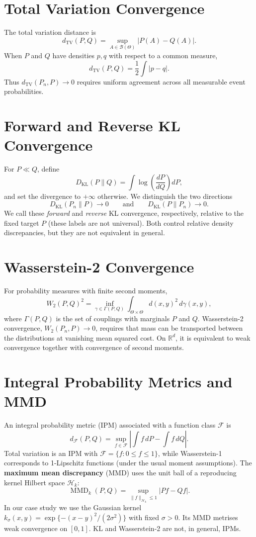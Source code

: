 \documentclass[
  11pt,
  a4paper,
  notitlepage
]{report}
\begin{document}
\section{Total Variation Convergence}\label{total-variation-convergence}

The total variation distance is \[
d_{\mathrm{TV}}(P,Q)=\sup_{A\in\mathcal B(\Theta)}|P(A)-Q(A)|.
\] When \(P\) and \(Q\) have densities \(p,q\) with respect to a common
measure, \[
d_{\mathrm{TV}}(P,Q)=\frac12\int|p-q|.
\] Thus \(d_{\mathrm{TV}}(P_n,P)\to0\) requires uniform agreement across
all measurable event probabilities.

\section{Forward and Reverse KL
Convergence}\label{forward-and-reverse-kl-convergence}

For \(P\ll Q\), define \[
D_{\mathrm{KL}}(P\|Q)=\int\log\left(\frac{dP}{dQ}\right)dP,
\] and set the divergence to \(+\infty\) otherwise. We distinguish the
two directions \[
D_{\mathrm{KL}}(P_n\|P)\to0
\qquad\text{and}\qquad
D_{\mathrm{KL}}(P\|P_n)\to0.
\] We call these \emph{forward} and \emph{reverse} KL convergence,
respectively, relative to the fixed target \(P\) (these labels are not
universal). Both control relative density discrepancies, but they are
not equivalent in general.

\section{Wasserstein-2 Convergence}\label{wasserstein-2-convergence}

For probability measures with finite second moments, \[
W_2(P,Q)^2=\inf_{\gamma\in\Gamma(P,Q)}
\int_{\Theta\times\Theta}d(x,y)^2\,d\gamma(x,y),
\] where \(\Gamma(P,Q)\) is the set of couplings with marginals \(P\)
and \(Q\). Wasserstein-2 convergence, \(W_2(P_n,P)\to0\), requires that
mass can be transported between the distributions at vanishing mean
squared cost. On \(\mathbb R^d\), it is equivalent to weak convergence
together with convergence of second moments.

\section{Integral Probability Metrics and
MMD}\label{integral-probability-metrics-and-mmd}

An integral probability metric (IPM) associated with a function class
\(\mathcal F\) is \[
d_{\mathcal F}(P,Q)=\sup_{f\in\mathcal F}
\left|\int f\,dP-\int f\,dQ\right|.
\] Total variation is an IPM with \(\mathcal F=\{f:0\le f\le1\}\), while
Wasserstein-1 corresponds to 1-Lipschitz functions (under the usual
moment assumptions). The \textbf{maximum mean discrepancy} (MMD) uses
the unit ball of a reproducing kernel Hilbert space \(\mathcal H_k\): \[
\operatorname{MMD}_k(P,Q)
=\sup_{\|f\|_{\mathcal H_k}\le1}|P f-Q f|.
\] In our case study we use the Gaussian kernel
\(k_\sigma(x,y)=\exp\{-(x-y)^2/(2\sigma^2)\}\) with fixed \(\sigma>0\).
Its MMD metrises weak convergence on \([0,1]\). KL and Wasserstein-2 are
not, in general, IPMs.
\end{document}
